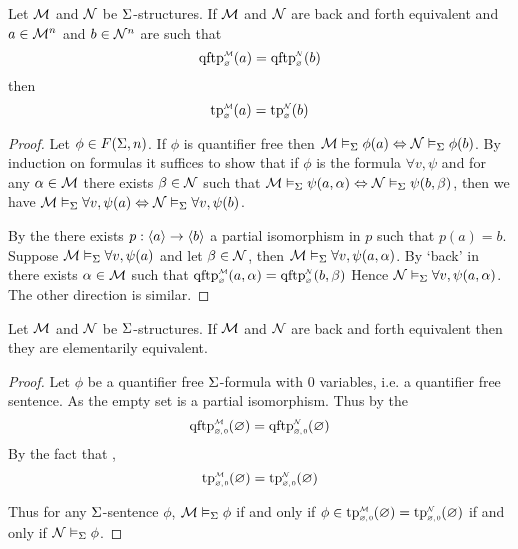 \begin{lem}
    Let $\mathcal{M}$ and $\mathcal{N}$ be $\Sigma$-structures.
    If $\mathcal{M}$ and $\mathcal{N}$ are back and forth equivalent and
    $a \in \mathcal{M}^n$ and $b \in \mathcal{N}^n$ are such that
    \[\subintp{\nothing}{\MM}{\qftp}(a) = 
    \subintp{\nothing}{\NN}{\qftp}(b)\]
    then \[\subintp{\nothing}{\MM}{\tp}(a) = 
    \subintp{\nothing}{\NN}{\tp}(b)\]
\end{lem}
\begin{proof}
    Let $\phi \in F(\Sigma,n)$.
    If $\phi$ is quantifier free then 
    $\mathcal{M} \vDash_{\Sigma} \phi(a) \Leftrightarrow \mathcal{N} \vDash_{\Sigma} \phi(b)$.
    By induction on formulas it suffices to show that if 
    $\phi$ is the formula $\forall v, \psi$ and 
    for any $\alpha \in \mathcal{M}$ there exists $\beta \in \mathcal{N}$ such that 
    $\mathcal{M} \vDash_{\Sigma} \psi(a,\alpha) \Leftrightarrow \mathcal{N} \vDash_{\Sigma} \psi(b,\beta)$, 
    then we have 
    $\mathcal{M} \vDash_{\Sigma} \forall v, \psi(a) \Leftrightarrow \mathcal{N} \vDash_{\Sigma} \forall v, \psi(b)$.

    By the 
    there exists $p : \langle a\rangle \to \langle b\rangle$ 
    a partial isomorphism in $p$ such that $p(a) = b$.
    Suppose $\mathcal{M} \vDash_{\Sigma} \forall v, \psi(a)$ and let $\beta \in \mathcal{N}$, 
    then $\mathcal{M} \vDash_{\Sigma} \forall v, \psi(a,\alpha)$.
    By `back' in 
    there exists $\alpha \in \mathcal{M}$ such that 
        $\subintp{\nothing}{\MM}{\qftp}(a,\al) = 
        \subintp{\nothing}{\NN}{\qftp}(b,\be)$
    Hence $\mathcal{N} \vDash_{\Sigma} \forall v, \psi(a,\alpha)$.
    The other direction is similar.
\end{proof}

\begin{cor}
    Let $\mathcal{M}$ and $\mathcal{N}$ be $\Sigma$-structures.
    If $\mathcal{M}$ and $\mathcal{N}$ are back and forth equivalent
    then they are elementarily equivalent.
\end{cor}
\begin{proof}
    Let $\phi$ be a quantifier free $\Sigma$-formula with $0$ variables,
    i.e. a quantifier free sentence.
    As the empty set is a partial isomorphism.
    Thus by the 
    \[\subintp{\nothing,0}{\MM}{\qftp}(\nothing) = 
    \subintp{\nothing,0}{\NN}{\qftp}(\nothing)\]
    By the fact that 
    ,
    \[\subintp{\nothing,0}{\MM}{\tp}(\nothing) = 
    \subintp{\nothing,0}{\NN}{\tp}(\nothing)\]
    
    Thus for any $\Sigma$-sentence $\phi$, $\mathcal{M} \vDash_{\Sigma} \phi$ if and only if 
    $\phi \in \subintp{\nothing,0}{\MM}{\tp}(\nothing) = 
    \subintp{\nothing,0}{\NN}{\tp}(\nothing)$
    if and only if $\mathcal{N} \vDash_{\Sigma} \phi$.
\end{proof}

